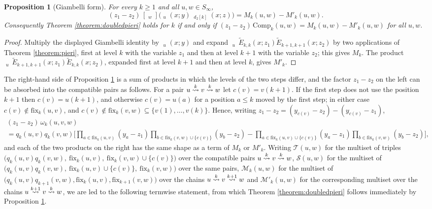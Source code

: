 \documentclass{amsart}
\newtheorem{proposition}[lemma]{Proposition}
\theoremstyle{definition}
\theoremstyle{remark}
\numberwithin{equation}{section}
\DeclareMathOperator{\qsch}{\widetilde{\mathfrak{S}}}
\newcommand{\xrightsquigarrow}[2][]{%
	\mathrel{\mathop{\rightsquigarrow}\limits^{\scriptstyle #2}%
	\ifx\hfuzz#1\hfuzz\else_{\scriptstyle #1}\fi}%
}
\newcommand{\tom}[1]{\ensuremath{\xrightsquigarrow{#1}}}
\newcommand{\fx}{\mathrm{fix}}
\newcommand{\qelem}{\widetilde{E}}
\begin{document}
\begin{proposition}[Giambelli form] \label{prop:giambelliform}
For every $k\geq1$ and all $u,w\in S_\infty$,
$$(z_1-z_2)\,[\qsch_w]\big(\qsch_u(x;y)\,\qsch_{d_2[k]}(x;z)\big)=M_k(u,w)-M'_k(u,w).$$
Consequently Theorem \ref{theorem:doubledpieri} holds for $k$ if and only if $(z_1-z_2)\,\mathrm{Comp}_k(u,w)=M_k(u,w)-M'_k(u,w)$ for all $u,w$.
\end{proposition}
\begin{proof}
Multiply the displayed Giambelli identity by $\qsch_u(x;y)$ and expand $\qsch_u\,\qelem_{k,k}(x;z_1)\qelem_{k+1,k+1}(x;z_2)$ by two applications of Theorem \ref{theorem:pieri}, first at level $k$ with the variable $z_1$ and then at level $k+1$ with the variable $z_2$; this gives $M_k$. The product $\qsch_u\,\qelem_{k+1,k+1}(x;z_1)\qelem_{k,k}(x;z_2)$, expanded first at level $k+1$ and then at level $k$, gives $M'_k$.
\end{proof}

The right-hand side of Proposition \ref{prop:giambelliform} is a sum of products in which the levels of the two steps differ, and the factor $z_1-z_2$ on the left can be absorbed into the compatible pairs as follows. For a pair $u\tom{k}v\tom{k}w$ let $c(v)=v(k+1)$. If the first step does not use the position $k+1$ then $c(v)=u(k+1)$, and otherwise $c(v)=u(a)$ for a position $a\leq k$ moved by the first step; in either case $c(v)\notin\fx_k(u,v)$, and $c(v)\notin\fx_k(v,w)\subseteq\{v(1),\ldots,v(k)\}$. Hence, writing $z_1-z_2=(y_{c(v)}-z_2)-(y_{c(v)}-z_1)$,
\begin{multline*}
(z_1-z_2)\,\omega_k(u,v,w)\\
=q_k(u,v)q_k(v,w)\Big[\prod_{a\in\fx_k(u,v)}(y_a-z_1)\prod_{b\in\fx_k(v,w)\cup\{c(v)\}}(y_b-z_2)-\prod_{a\in\fx_k(u,v)\cup\{c(v)\}}(y_a-z_1)\prod_{b\in\fx_k(v,w)}(y_b-z_2)\Big],
\end{multline*}
and each of the two products on the right has the same shape as a term of $M_k$ or $M'_k$. Writing $\mathcal T(u,w)$ for the multiset of triples $\big(q_k(u,v)q_k(v,w),\ \fx_k(u,v),\ \fx_k(v,w)\cup\{c(v)\}\big)$ over the compatible pairs $u\tom{k}v\tom{k}w$, $\mathcal S(u,w)$ for the multiset of $\big(q_k(u,v)q_k(v,w),\ \fx_k(u,v)\cup\{c(v)\},\ \fx_k(v,w)\big)$ over the same pairs, $\mathcal M_k(u,w)$ for the multiset of $\big(q_k(u,v)q_{k+1}(v,w),\fx_k(u,v),\fx_{k+1}(v,w)\big)$ over the chains $u\tom{k}v\tom{k+1}w$ and $\mathcal M'_k(u,w)$ for the corresponding multiset over the chains $u\tom{k+1}v\tom{k}w$, we are led to the following termwise statement, from which Theorem \ref{theorem:doubledpieri} follows immediately by Proposition \ref{prop:giambelliform}.
\end{document}
